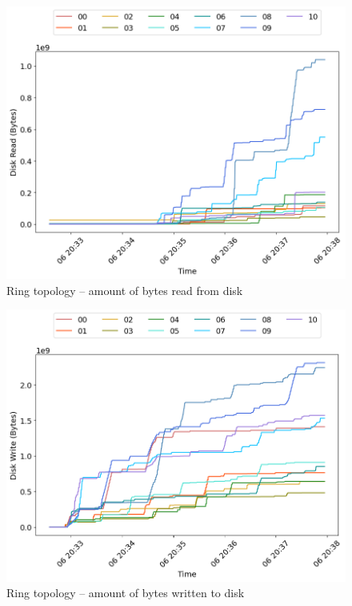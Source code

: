 \begin{minipage}{0.5\linewidth}
\begin{figure}[H]
\captionsetup{justification=centering,width=0.8\linewidth}
\includegraphics[width=\linewidth]{figures/ring/blk_read.png}
\caption{Ring topology -- amount of bytes read from disk}
\label{fig:ring-blk_read}
\end{figure}
\end{minipage}
\begin{minipage}{0.5\linewidth}
\begin{figure}[H]
\captionsetup{justification=centering,width=0.8\linewidth}
\includegraphics[width=\linewidth]{figures/ring/blk_write.png}
\caption{Ring topology -- amount of bytes written to disk}
\label{fig:ring-blk_write}
\end{figure}
\end{minipage}

